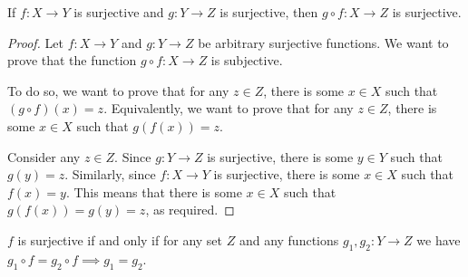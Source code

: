 \begin{proposition}
If $f:X\to Y$ is surjective and $g:Y\to Z$ is surjective, then $g \circ f:X\to Z$ is surjective.
\end{proposition}
\begin{proof}
Let $f:X\to Y$ and $g:Y\to Z$ be arbitrary surjective functions. We want to prove that the function $g \circ f:X\to Z$ is subjective. 

To do so, we want to prove that for any $z \in Z$, there is some $x \in X$ such that $(g \circ f)(x) = z$. Equivalently, we want to prove that for any $z \in Z$, there is some $x \in X$ such that $g(f(x)) = z$.

Consider any $z \in Z$. Since $g:Y\to Z$ is surjective, there is some $y \in Y$ such that $g(y) = z$. Similarly, since $f:X\to Y$ is surjective, there is some $x \in X$ such that $f(x) = y$. This means that there is some $x \in X$ such that $g(f(x)) = g(y) = z$, as required.
\end{proof}

\begin{proposition}
$f$ is surjective if and only if for any set $Z$ and any functions $g_1,g_2:Y\to Z$ we have $g_1 \circ f=g_2 \circ f \implies g_1=g_2$.
\end{proposition}

